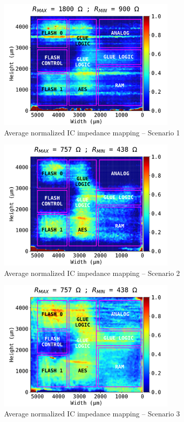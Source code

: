 \documentclass[10pt, conference, compsocconf]{IEEEtran}
\begin{document}
\begin{figure}[!hbtp]
\centering
\includegraphics[width=3.35in]{resMap_M0}
\caption{Average normalized IC impedance mapping – Scenario 1}
\label{rCartos_M0_ignd}
\end{figure}

\begin{figure}[!hbtp]
\centering
\includegraphics[width=3.35in]{resMap_M1}
\caption{Average normalized IC impedance mapping – Scenario 2}
\label{rCartos_M1_ignd}
\end{figure}

\begin{figure}[!hbtp]
\centering
\includegraphics[width=3.35in]{resMap_M2}
\caption{Average normalized IC impedance mapping – Scenario 3}
\label{rCartos_M2_ignd}
\end{figure}
\end{document}
